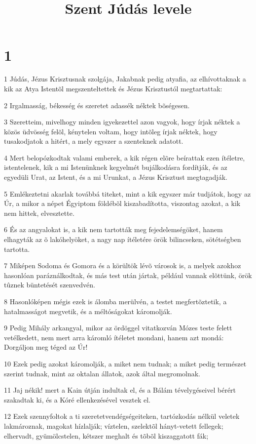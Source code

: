 

\title{Szent Júdás levele}


\chapter{1}

\par 1 Júdás, Jézus Krisztusnak szolgája, Jakabnak pedig atyafia, az elhívottaknak a kik az Atya Istentõl megszenteltettek és Jézus Krisztustól megtartattak:
\par 2 Irgalmasság, békesség és szeretet adassék néktek bõségesen.
\par 3 Szeretteim, mivelhogy minden igyekezettel azon vagyok, hogy írjak néktek a közös üdvösség felõl, kénytelen voltam, hogy intõleg írjak néktek, hogy tusakodjatok a hitért, a mely egyszer a szenteknek adatott.
\par 4 Mert belopózkodtak valami emberek, a kik régen elõre beírattak ezen ítéletre, istentelenek, kik a mi Istenünknek kegyelmét bujálkodásra fordítják, és az egyedüli Urat, az Istent, és a mi Urunkat, a Jézus Krisztust megtagadják.
\par 5 Emlékeztetni akarlak továbbá titeket, mint a kik egyszer már tudjátok, hogy az Úr, a mikor a népet Égyiptom földébõl kiszabadította, viszontag azokat, a kik nem hittek, elvesztette.
\par 6 És az angyalokat is, a kik nem tartották meg fejedelemségöket, hanem elhagyták az õ lakóhelyöket, a nagy nap ítéletére örök bilincseken, sötétségben tartotta.
\par 7 Miképen Sodoma és Gomora és a körültök lévõ városok is, a melyek azokhoz hasonlóan paráználkodtak, és más test után jártak, például vannak elõttünk, örök tûznek büntetését szenvedvén.
\par 8 Hasonlóképen mégis ezek is álomba merülvén, a testet megfertõztetik, a hatalmasságot megvetik, és a méltóságokat káromolják.
\par 9 Pedig Mihály arkangyal, mikor az ördöggel vitatkozván  Mózes teste felett vetélkedett, nem mert arra káromló ítéletet mondani, hanem azt mondá: Dorgáljon meg téged az Úr!
\par 10 Ezek pedig azokat káromolják, a miket nem tudnak; a miket pedig természet szerint tudnak, mint az oktalan állatok, azok által megromolnak.
\par 11 Jaj nékik! mert a Kain útján indultak el, és  a Bálám tévelygéseivel bérért szakadtak ki, és a Kóré ellenkezésével vesztek el.
\par 12 Ezek szennyfoltok a ti szeretetvendégségeiteken, tartózkodás nélkül veletek lakmároznak, magokat hízlalják; víztelen, szelektõl hányt-vetett fellegek; elhervadt, gyümölcstelen, kétszer meghalt és tõbõl kiszaggatott fák;

